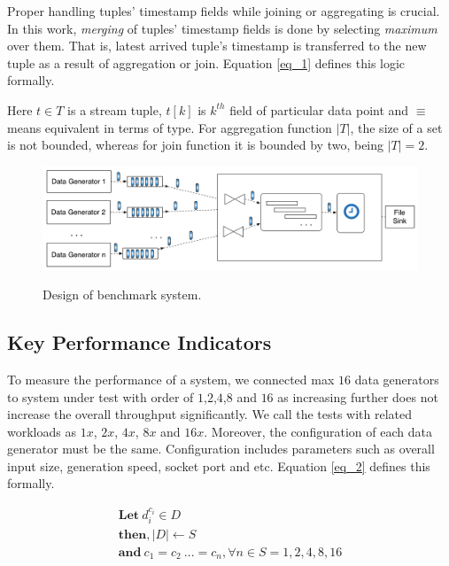 \documentclass{vldb}
\begin{document}
Proper handling tuples' timestamp fields while joining or aggregating is crucial. In this work, \textit{merging} of tuples' timestamp fields is done by selecting \textit{maximum} over them. That is, latest arrived tuple's timestamp is transferred to the new tuple as a result of aggregation or join. Equation \ref{eq_1} defines this logic formally.


Here $t \in T$ is a stream tuple,  $t[k]$ is  $k^{th}$ field of particular data point and $\equiv$ means equivalent in terms of type. For aggregation function $|T|$, the size of a set is not bounded, whereas for join function it is bounded by two, being $|T| = 2$.

\begin{figure}[h]
\caption{Design of benchmark system.}
\centering
\includegraphics[width=1\textwidth]{system_design}
\label{fig_design}
\end{figure}


\subsection{Key Performance Indicators}
To measure the performance of a system, we connected max $16$ data generators to system under test with order of $1$,$2$,$4$,$8$ and $16$ as increasing further does not increase the overall throughput significantly. We call the tests with related workloads as $1x$, $2x$, $4x$, $8x$ and $16x$. Moreover, the configuration of each data generator must be the same. Configuration includes parameters such as overall input size, generation speed, socket port and etc. Equation \ref{eq_2} defines this formally.

\begin{equation}
  \begin{gathered}
 \textbf{Let} \ d_{i}^{c_{i}} \in  D\\
  \textbf{then}, |D| \gets S \\
  \textbf{and} \ c_{1} = c_{2} \ ... = c_{n}, \forall n \in S = {1,2,4,8,16}
  \end{gathered}\label{eq_2}
\end{equation}
\end{document}
